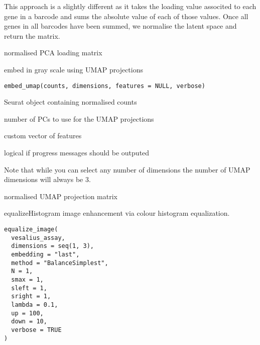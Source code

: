 \documentclass[a4paper]{book}
\begin{document}
%
\begin{Details}
This approach is a slightly different as it takes 
the loading value associted to each gene in a barcode and sums
the absolute value of each of those values. 
Once all genes in all barcodes have been summed,
we normalise the latent space and return the matrix.
\end{Details}
%
\begin{Value}
normalised PCA loading matrix
\end{Value}
%
\begin{Description}
embed in gray scale using UMAP projections
\end{Description}
%
\begin{Usage}
\begin{verbatim}
embed_umap(counts, dimensions, features = NULL, verbose)
\end{verbatim}
\end{Usage}
%
\begin{Arguments}
\begin{ldescription}
\item[\code{counts}] Seurat object containing normalised counts

\item[\code{dimensions}] number of PCs to use for the UMAP projections

\item[\code{features}] custom vector of features

\item[\code{verbose}] logical if progress messages should be outputed
\end{ldescription}
\end{Arguments}
%
\begin{Details}
Note that while you can select any number of dimensions
the number of UMAP dimensions will always be 3.
\end{Details}
%
\begin{Value}
normalised UMAP projection matrix
\end{Value}
%
\begin{Description}
equalizeHistogram image enhancement via colour histogram equalization.
\end{Description}
%
\begin{Usage}
\begin{verbatim}
equalize_image(
  vesalius_assay,
  dimensions = seq(1, 3),
  embedding = "last",
  method = "BalanceSimplest",
  N = 1,
  smax = 1,
  sleft = 1,
  sright = 1,
  lambda = 0.1,
  up = 100,
  down = 10,
  verbose = TRUE
)
\end{verbatim}
\end{Usage}
\end{document}
